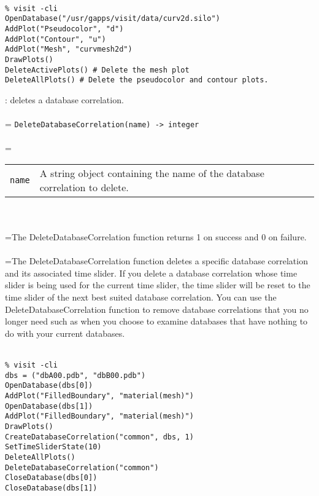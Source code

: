 \documentclass[10pt,a4paper]{report}
\begin{document}
\\[-6mm]
\begin{verbatim}% visit -cli
OpenDatabase("/usr/gapps/visit/data/curv2d.silo")
AddPlot("Pseudocolor", "d")
AddPlot("Contour", "u")
AddPlot("Mesh", "curvmesh2d")
DrawPlots()
DeleteActivePlots() # Delete the mesh plot
DeleteAllPlots() # Delete the pseudocolor and contour plots.
\end{verbatim}
\newpage


{}
: deletes a database correlation.\\[-3mm]

 \\ 
\hangindent=\parindent 
\verb!DeleteDatabaseCorrelation(name) -> integer!\\ [-3mm]

 \\ 
\hangindent=\parindent 
\begin{tabular}{lp{9cm}}
\verb!name! & A string object containing the name of the database correlation to delete. \\
\end{tabular} \\[-2mm]


 \\ 
\hangindent=\parindent The DeleteDatabaseCorrelation function returns 1 on success and 0 on failure. \\[-3mm] 

 \\ 
\hangindent=\parindent The DeleteDatabaseCorrelation function deletes a specific database correlation and its associated time slider. If you delete a database correlation whose time slider is being used for the current time slider, the time slider will be reset to the time slider of the next best suited database correlation. You can use the DeleteDatabaseCorrelation function to remove database correlations that you no longer need such as when you choose to examine databases that have nothing to do with your current databases. \\[-3mm] 

\\[-6mm]
\begin{verbatim}% visit -cli
dbs = ("dbA00.pdb", "dbB00.pdb")
OpenDatabase(dbs[0])
AddPlot("FilledBoundary", "material(mesh)")
OpenDatabase(dbs[1])
AddPlot("FilledBoundary", "material(mesh)")
DrawPlots()
CreateDatabaseCorrelation("common", dbs, 1)
SetTimeSliderState(10)
DeleteAllPlots()
DeleteDatabaseCorrelation("common")
CloseDatabase(dbs[0])
CloseDatabase(dbs[1])
\end{verbatim}
\newpage
\end{document}
